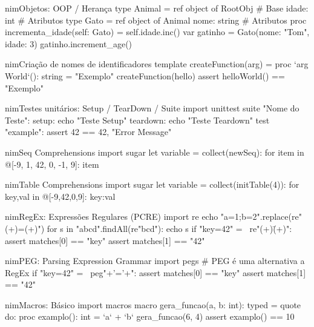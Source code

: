 \documentclass[10pt, a4paper]{article}
\begin{document}
\begin{multicols}{4}
\begin{codebox}{nim}{Objetos: OOP / Herança}
type Animal = ref object of RootObj # Base
  idade: int # Atributos
type Gato = ref object of Animal
  nome: string  # Atributos
proc incrementa_idade(self: Gato) =
  self.idade.inc()
var gatinho = Gato(nome: "Tom", idade: 3)
gatinho.increment_age()
\end{codebox}


\begin{codebox}{nim}{Criação de nomes de identificadores}
template createFunction(arg) =
  proc `arg  World`(): string = "Exemplo"
createFunction(hello)
assert helloWorld() == "Exemplo"
\end{codebox}


\begin{codebox}{nim}{Testes unitários: Setup / TearDown / Suite}
import unittest
suite "Nome do Teste":
  setup:
    echo "Teste Setup"
  teardown:
    echo "Teste Teardown"
  test "example":
    assert 42 == 42, "Error Message"
\end{codebox}


\begin{codebox}{nim}{Seq Comprehensions}
import sugar
let variable = collect(newSeq):
  for item in @[-9, 1, 42, 0, -1, 9]: item
\end{codebox}


\begin{codebox}{nim}{Table Comprehensions}
import sugar
let variable = collect(initTable(4)):
  for key,val in @[-9,42,0,9]: {key:val}
\end{codebox}


\begin{codebox}{nim}{RegEx: Expressões Regulares (PCRE)}
import re
echo "a=1;b=2".replace(re"(\w+)=(\w+)")
for s in "abcd".findAll(re"bcd"): echo s
if "key=42" =~ re"(\w+)\=(\w+)":
  assert matches[0] == "key"
  assert matches[1] == "42"
\end{codebox}


\begin{codebox}{nim}{PEG: Parsing Expression Grammar}
import pegs # PEG é uma alternativa a RegEx
if "key=42" =~ peg"{\w+}'='{\w+}":
  assert matches[0] == "key"
  assert matches[1] == "42"
\end{codebox}


\begin{codebox}{nim}{Macros: Básico}
import macros
macro gera_funcao(a, b: int): typed =
  quote do:
    proc examplo(): int = `a` + `b`
gera_funcao(6, 4)
assert examplo() == 10
\end{codebox}



\end{multicols}
\end{document}
